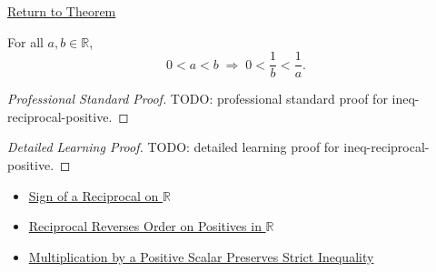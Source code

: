 \newpage
{}
\label{prf:ineq-reciprocal-positive}

\begin{remark*}[Return]
\hyperref[thm:ineq-reciprocal-positive]{Return to Theorem}
\end{remark*}

\begin{theorem*}
For all $a, b \in \mathbb{R}$,
\[
  0 < a < b \;\Rightarrow\; 0 < \frac{1}{b} < \frac{1}{a}.
\]
\end{theorem*}

\begin{proof}[Professional Standard Proof]
\LRAProofBodyStart
TODO: professional standard proof for ineq-reciprocal-positive.
\end{proof}

\begin{proof}[Detailed Learning Proof]
\LRAProofBodyStart
TODO: detailed learning proof for ineq-reciprocal-positive.
\end{proof}

\begin{remark*}
\end{remark*}

\begin{dependencies}
\begin{itemize}
  \item \hyperref[thm:sign-of-reciprocal-r]{Sign of a Reciprocal on $\mathbb{R}$}
  \item \hyperref[thm:reciprocal-reverses-order-on-positives-r]{Reciprocal Reverses Order on Positives in $\mathbb{R}$}
  \item \hyperref[thm:ineq-multiply-positive]{Multiplication by a Positive Scalar Preserves Strict Inequality}
\end{itemize}
\end{dependencies}

\clearpage
